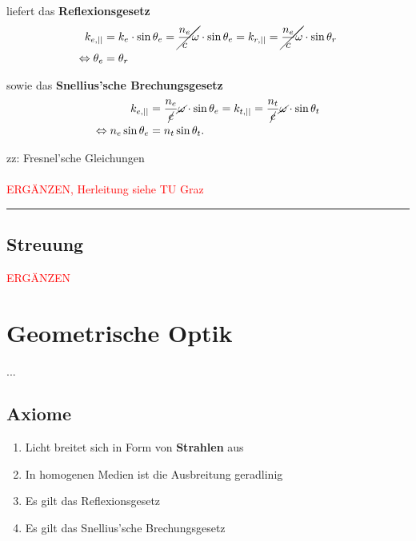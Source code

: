 \documentclass{article}
\begin{document}
{	liefert das \textbf{Reflexionsgesetz}
		\begin{align*}
			k_{e,||} &= k_e \cdot \sin\theta_e = \cancel{ \frac{n_e}{c} \omega } \cdot \sin\theta_e = k_{r,||} = \cancel{ \frac{n_e}{c} \omega } \cdot \sin\theta_r \\
			\Leftrightarrow \theta_e &= \theta_r
		\end{align*}
	
	sowie das \textbf{Snellius'sche Brechungsgesetz}
		\begin{align*}
			k_{e,||} &= \frac{n_e}{ \cancel{c} } \cancel{\omega} \cdot \sin\theta_e = k_{t,||} = \frac{n_t}{ \cancel{c} } \cancel{\omega} \cdot \sin\theta_t \\
			\Leftrightarrow n_e \sin\theta_e &= n_t \sin\theta_t.
		\end{align*}
	
	\dotfill
	
	zz: Fresnel'sche Gleichungen\\
	\\
	\textcolor{red}{ERGÄNZEN, Herleitung siehe TU Graz}
\hrule
}


\newpage


\subsection{Streuung}
\textcolor{red}{ERGÄNZEN}



\newpage


\section{Geometrische Optik}
...

\subsection{Axiome}
	\begin{enumerate}
	\setlength{\itemsep}{0cm}
		\item Licht breitet sich in Form von \textbf{Strahlen} aus
		
		\item In homogenen Medien ist die Ausbreitung geradlinig
		
		\item Es gilt das Reflexionsgesetz
		
		\item Es gilt das Snellius'sche Brechungsgesetz
	\end{enumerate}
\end{document}
